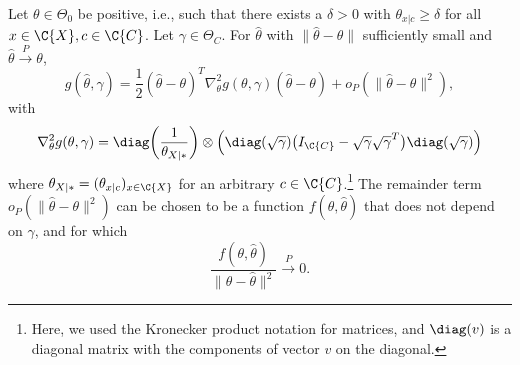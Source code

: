 \begin{Lem}\label{lem:g_derivatives_H0}
  Let $\theta \in \Theta_0$ be positive, i.e., such that there exists a $\delta > 0$ with $\theta_{x|c} \ge \delta$ for all $x \in \C{X}, c \in \C{C}$.
  Let $\gamma \in \Theta_C$.
  For $\hat\theta$ with $\lVert \hat\theta - \theta \rVert$ sufficiently small and $\hat\theta \stackrel{P}{\to} \theta$,
  \begin{equation}
    g(\hat\theta, \gamma) = \frac{1}{2} (\hat\theta - \theta)^T \nabla^2_\theta g(\theta,\gamma) (\hat\theta - \theta) + o_P(\lVert\hat\theta - \theta\rVert^2),
  \end{equation}
  with
  $$\nabla^2_{\theta} g(\theta,\gamma) 
    = \diag\bigg(\frac{1}{\theta_{X|\ast}}\bigg) \otimes \Big(\diag(\sqrt{\gamma}) \big(I_{\C{C}} - \sqrt{\gamma} \sqrt{\gamma}^T\big)\diag(\sqrt{\gamma})\Big)$$
  where $\theta_{X|\ast} = (\theta_{x|c})_{x\in\C{X}}$ for an arbitrary $c \in \C{C}$.\footnote{Here, we used the Kronecker product notation for matrices, and $\diag(v)$ is a diagonal matrix with the components of vector $v$ on the diagonal.}
  The remainder term $o_P(\lVert\hat\theta - \theta\rVert^2)$ can be chosen to be a function $f(\theta,\hat\theta)$ that does not depend on $\gamma$, and for which
  $$\frac{f(\theta,\hat\theta)}{\lVert\theta - \hat\theta\rVert^2} \stackrel{P}{\to} 0.$$
\end{Lem}
